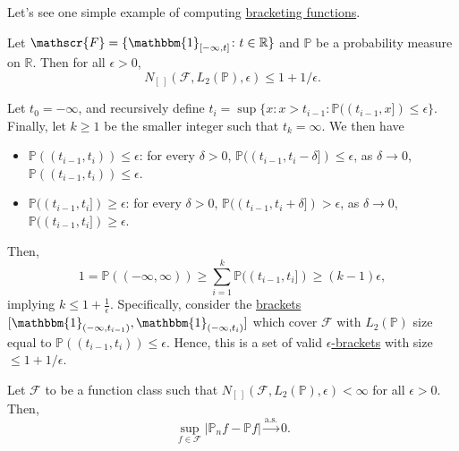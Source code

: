 Let's see one simple example of computing \hyperref[def:eps-bracket]{bracketing functions}.

\begin{eg}
	Let \(\mathscr{F} = \{ \mathbbm{1}_{[-\infty , t]} \colon t \in \mathbb{R}  \} \) and \(\mathbb{P} \) be a probability measure on \(\mathbb{R} \). Then for all \(\epsilon > 0\),
	\[
		N_{[\ ]}(\mathscr{F} , L_2(\mathbb{P} ) , \epsilon ) \leq 1 + 1 / \epsilon.
	\]
\end{eg}
\begin{explanation}
	Let \(t_0 = -\infty \), and recursively define \(t_i = \sup \{x\colon x> t_{i-1} \colon \mathbb{P}((t_{i-1}, x]) \leq \epsilon \} \). Finally, let \(k \geq 1\) be the smaller integer such that \(t_k = \infty \). We then have
	\begin{itemize}
		\item \(\mathbb{P} ((t_{i-1} , t_i))\leq \epsilon \): for every \(\delta > 0\), \(\mathbb{P} ((t_{i-1}, t_i - \delta ]) \leq \epsilon \), as \(\delta \to 0\), \(\mathbb{P} ((t_{i-1} , t_i)) \leq \epsilon \).
		\item \(\mathbb{P} ((t_{i-1}, t_i]) \geq \epsilon \): for every \(\delta > 0\), \(\mathbb{P} ((t_{i-1}, t_i + \delta ]) > \epsilon \), as \(\delta \to 0\), \(\mathbb{P} ((t_{i-1}, t_i]) \geq \epsilon \).
	\end{itemize}
	Then,
	\[
		1
		= \mathbb{P} ((-\infty , \infty ))
		\geq \sum_{i=1}^{k} \mathbb{P} ((t_{i-1}, t_i])
		\geq (k-1) \epsilon,
	\]
	implying \(k \leq 1 + \frac{1}{\epsilon }\). Specifically, consider the \hyperref[def:eps-bracket]{brackets} \([\mathbbm{1}_{(-\infty , t_{i-1})} , \mathbbm{1}_{(-\infty , t_i)} ]\) which cover \(\mathscr{F} \) with \(L_2(\mathbb{P} )\) size equal to \(\mathbb{P} ((t_{i-1} , t_i)) \leq \epsilon \). Hence, this is a set of valid \hyperref[def:eps-bracket]{\(\epsilon \)-brackets} with size \(\leq 1 + 1 / \epsilon \).
\end{explanation}
\begin{proposition}
	Let \(\mathscr{F} \) to be a function class such that \(N_{[\ ]}(\mathscr{F} , L_2(\mathbb{P} ), \epsilon ) < \infty \) for all \(\epsilon > 0\). Then,
	\[
		\sup _{f\in\mathscr{F} } \vert \mathbb{P} _n f - \mathbb{P} f \vert \overset{\text{a.s.} }{\to } 0.
	\]
\end{proposition}
